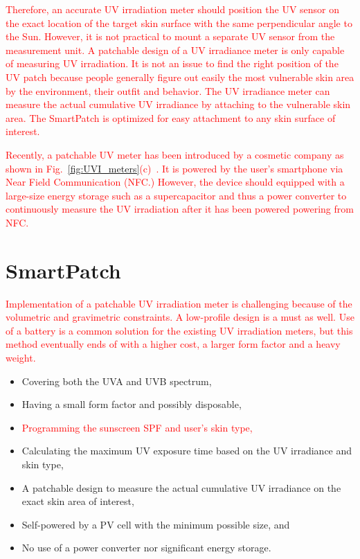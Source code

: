 \documentclass[journal]{IEEEtran}
\begin{document}
\textcolor{red}{Therefore, an accurate UV irradiation meter should position the UV sensor on the exact location of the target skin surface with the same perpendicular angle to the Sun. However, it is not practical to mount a separate UV sensor from the measurement unit. A patchable design of a UV irradiance meter is only capable of measuring UV irradiation. It is not an issue to find the right position of the UV patch because people generally figure out easily the most vulnerable skin area by the environment, their outfit and behavior. The UV irradiance meter can measure the actual cumulative UV irradiance by attaching to the vulnerable skin area. The  SmartPatch is optimized for easy attachment  to any skin surface of interest.}

\textcolor{red}{Recently, a patchable UV meter has been introduced by a cosmetic company as shown in Fig.~\ref{fig:UVI_meters}(c)~\cite{LOreal}. It is powered by the user's smartphone via Near Field Communication (NFC.) However, the device should equipped with a large-size energy storage such as a supercapacitor and thus a power converter to continuously measure the UV irradiation after it has been powered powering from NFC.}

\section{SmartPatch}

\textcolor{red}{Implementation of a patchable UV irradiation meter is challenging because of the volumetric and gravimetric constraints. A low-profile design is a must as well. Use of a battery is a common solution for the existing UV irradiation meters, but this method eventually ends of with a higher cost, a larger form factor and a heavy weight.}


\begin{itemize}
\item Covering both the UVA and UVB spectrum,
\item Having a small form factor and possibly disposable,
\item \textcolor{red}{Programming the sunscreen SPF and user's skin type,}
\item Calculating the maximum UV exposure time based on the UV irradiance and skin type,
\item A patchable design to measure the actual cumulative UV irradiance on the exact skin area of interest,
\item Self-powered by a PV cell with the minimum possible size, and
\item No use of a power converter nor significant energy storage.
\end{itemize}
\end{document}
